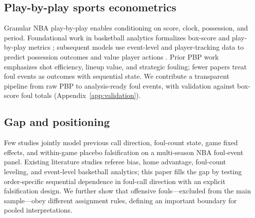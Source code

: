 \subsection{Play-by-play sports econometrics}

Granular NBA play-by-play enables conditioning on score, clock, possession, and period. Foundational work in basketball analytics formalizes box-score and play-by-play metrics \citep{kubatko2007}; subsequent models use event-level and player-tracking data to predict possession outcomes and value player actions \citep{cervone2014ssac,cervone2016}. Prior PBP work emphasizes shot efficiency, lineup value, and strategic fouling; fewer papers treat foul events as outcomes with sequential state. We contribute a transparent pipeline from raw PBP to analysis-ready foul events, with validation against box-score foul totals (Appendix~\ref{app:validation}).

\subsection{Gap and positioning}

Few studies jointly model previous call direction, foul-count state, game fixed effects, and within-game placebo falsification on a multi-season NBA foul-event panel. Existing literature studies referee bias, home advantage, foul-count leveling, and event-level basketball analytics; this paper fills the gap by testing order-specific sequential dependence in foul-call direction with an explicit falsification design. We further show that offensive fouls---excluded from the main sample---obey different assignment rules, defining an important boundary for pooled interpretations.
